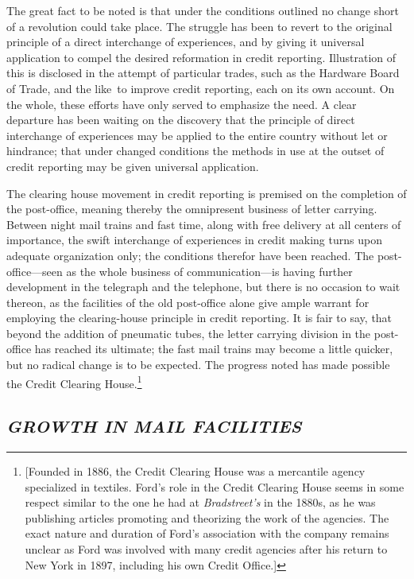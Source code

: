 \documentclass[openany,nobib]{tufte-book}
\begin{document}
The great fact to be noted is that under the conditions outlined no
change short of a revolution could take place. The struggle has been to
revert to the original principle of a direct interchange of experiences,
and by giving it universal application to compel the desired reformation
in credit reporting. Illustration of this is disclosed in the attempt of
particular trades, such as the Hardware Board of Trade, and the like~to
improve credit reporting, each on its own account. On the whole, these
efforts have only served to emphasize the need. A clear departure has
been waiting on the discovery that the principle of direct interchange
of experiences may be applied to the entire country without let or
hindrance; that under changed conditions the methods in use at the
outset of credit reporting may be given universal application.~

The clearing house movement in credit reporting is premised on the
completion of the post-office, meaning thereby the omnipresent business
of letter carrying. Between night mail trains and fast time, along with
free delivery at all centers of importance, the swift interchange of
experiences in credit making turns upon adequate organization only; the
conditions therefor have been reached. The post-office---seen as the
whole business of communication---is having further development in the
telegraph and the telephone, but there is no occasion to wait thereon,
as the facilities of the old post-office alone give ample warrant for
employing the clearing-house principle in credit reporting. It is fair
to say, that beyond the addition of pneumatic tubes, the letter carrying
division in the post-office has reached its ultimate; the fast mail
trains may become a little quicker, but no radical change is to be
expected. The progress noted has made possible the Credit Clearing
House.\footnote{{[}Founded in 1886, the Credit Clearing House was a
  mercantile agency specialized in textiles. Ford's role in the Credit
  Clearing House seems in some respect similar to the one he had at
  \emph{Bradstreet's} in the 1880s, as he was publishing articles
  promoting and theorizing the work of the agencies. The exact nature
  and duration of Ford's association with the company remains unclear as
  Ford was involved with many credit agencies after his return to New
  York in 1897, including his own Credit Office.{]}}

\hypertarget{growth-in-mail-facilities}{%
\subsection{\texorpdfstring{\emph{GROWTH IN MAIL
FACILITIES}}{GROWTH IN MAIL FACILITIES}}\label{growth-in-mail-facilities}}
\end{document}
